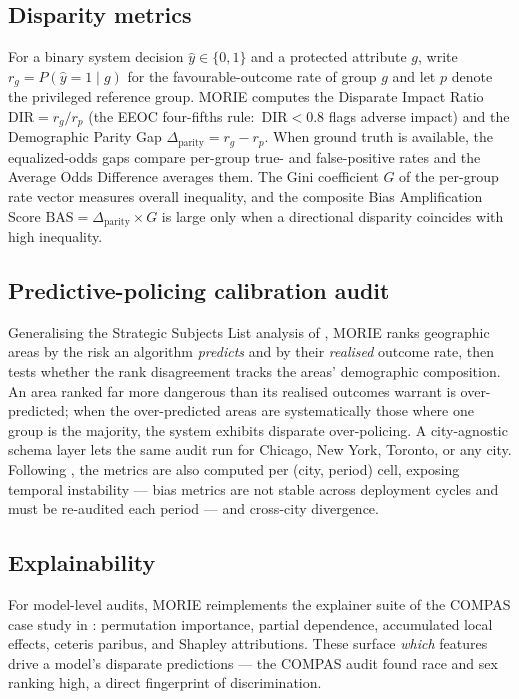 \documentclass[article,shortnames,nojss]{jss}
\begin{document}
\subsection{Disparity metrics}

For a binary system decision $\hat{y}\in\{0,1\}$ and a protected
attribute $g$, write $r_g = P(\hat{y}=1\mid g)$ for the
favourable-outcome rate of group $g$ and let $p$ denote the privileged
reference group.  MORIE computes the Disparate Impact Ratio
$\text{DIR} = r_g / r_p$ (the EEOC four-fifths rule:\ $\text{DIR}<0.8$
flags adverse impact) and the Demographic Parity Gap
$\Delta_{\text{parity}} = r_g - r_p$.  When ground truth is available,
the equalized-odds gaps compare per-group true- and false-positive
rates and the Average Odds Difference averages them.  The Gini
coefficient $G$ of the per-group rate vector measures overall
inequality, and the composite Bias Amplification Score
$\text{BAS} = \Delta_{\text{parity}}\times G$
\citep{Barman2026PredictivePolicingBias} is large only when a
directional disparity coincides with high inequality.

\subsection{Predictive-policing calibration audit}

Generalising the Strategic Subjects List analysis of
\citet{Lacherade2021PredPolChicago}, MORIE ranks geographic areas by
the risk an algorithm \emph{predicts} and by their \emph{realised}
outcome rate, then tests whether the rank disagreement tracks the
areas' demographic composition.  An area ranked far more dangerous
than its realised outcomes warrant is over-predicted; when the
over-predicted areas are systematically those where one group is the
majority, the system exhibits disparate over-policing.  A
city-agnostic schema layer lets the same audit run for Chicago, New
York, Toronto, or any city.  Following
\citet{Barman2026PredictivePolicingBias}, the metrics are also
computed per (city, period) cell, exposing temporal instability ---
bias metrics are not stable across deployment cycles and must be
re-audited each period --- and cross-city divergence.

\subsection{Explainability}

For model-level audits, MORIE reimplements the explainer suite of the
COMPAS case study in \citet{Biecek2021XAIStories}: permutation
importance, partial dependence, accumulated local effects, ceteris
paribus, and Shapley attributions.  These surface \emph{which}
features drive a model's disparate predictions --- the COMPAS audit
found race and sex ranking high, a direct fingerprint of
discrimination.
\end{document}
